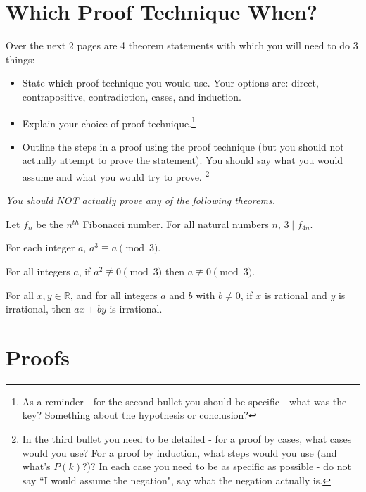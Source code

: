 \documentclass[11pt,answers]{exam}
\newcommand{\Z}{\mathbb{Z}}
\begin{document}
\section{Which Proof Technique When?}

Over the next 2 pages are 4 theorem statements with which you will need to do 3 things:
	\begin{itemize}
	\item State which proof technique you would use. Your options are: direct, contrapositive, contradiction, cases, and induction.
	\item Explain your choice of proof technique.\footnote{As a reminder - for the second bullet you should be specific - what was the key? Something about the hypothesis or conclusion?
}
	\item Outline the steps in a proof using the proof technique (but you should not actually attempt to prove the statement). You should say what you would assume and what you would try to prove. \footnote{In the third bullet you need to be detailed - for a proof by cases, what cases would you use? For a proof by induction, what steps would you use (and what's $P(k)$?)? In each case you need to be as specific as possible - do not say ``I would assume the negation", say what the negation actually is. }
	 
	\end{itemize}
\emph{You should NOT actually prove any of the following theorems.}

\begin{questions}
\question Let $f_n$ be the $n^{th}$ Fibonacci number. For all natural numbers $n$, $3\mid f_{4n}$.

\vfill

\question For each integer $a$, $a^3 \equiv a \pmod{3}$.
\vfill
\newpage

\question For all integers $a$, if $a^2\not\equiv  0\pmod{3}$ then $a\not\equiv 0\pmod{3}$.
\vfill

\question For all $x,y\in \mathbb{R}$, and for all integers $a$ and $b$ with $b\neq 0$, if $x$ is rational and $y$ is irrational, then $ax+by$ is irrational.
\vfill

\end{questions}

\newpage

\section{Proofs}
\end{document}
